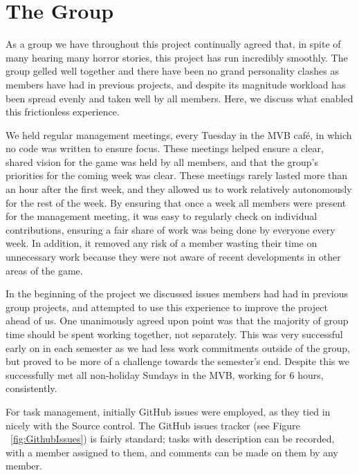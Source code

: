 \documentclass[a4paper,oneside]{memoir}
\begin{document}
	\chapter{The Group}

		As a group we have throughout this project continually agreed that, in spite of many hearing many horror stories, this project has run incredibly smoothly. The group gelled well together and there have been no grand personality clashes as members have had in previous projects, and despite its magnitude workload has been spread evenly and taken well by all members. Here, we discuss what enabled this frictionless experience.

		We held regular management meetings, every Tuesday in the MVB caf\'{e}, in which no code was written to ensure focus. 
		These meetings helped ensure a clear, shared vision for the game was held by all members, and that the group's priorities for the coming week was clear. 
		These meetings rarely lasted more than an hour after the first week, and they allowed us to work relatively autonomously for the rest of the week.
		By ensuring that once a week all members were present for the management meeting, it was easy to regularly check on individual contributions, 
		ensuring a fair share of work was being done by everyone every week.
		In addition, it removed any risk of a member wasting their time on unnecessary work because they were not aware of recent developments in other areas of the game.

		In the beginning of the project we discussed issues members had had in previous group projects, and attempted to use this experience to improve the project ahead of us. 
		One unanimously agreed upon point was that the majority of group time should be spent working together, not separately. 
		This was very successful early on in each semester as we had less work commitments outside of the group, but proved to be more of a challenge towards the semester's end.
		Despite this we successfully met all non-holiday Sundays in the MVB, working for 6 hours, consistently.

		For task management, initially GitHub issues were employed, as they tied in nicely with the Source control. 
		The GitHub issues tracker (see Figure ~\ref{fig:GithubIssues}) is fairly standard; tasks with description can be recorded, with a member assigned to them, and comments can be made on them by any member. 
\end{document}
